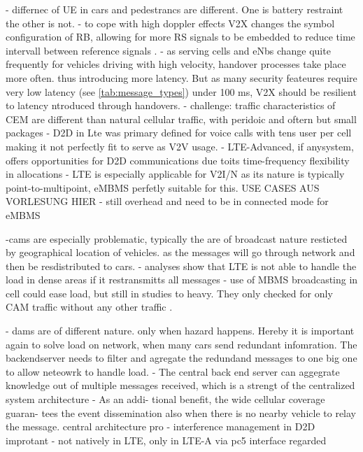 \documentclass[conference,12pt,onecolumn]{IEEEtran}
\begin{document}
- differnec of UE in cars and pedestrancs are different. One is battery restraint the other is not.
- to cope with high doppler effects V2X changes the symbol configuration of RB, allowing for more RS signals to be embedded to reduce time intervall between reference signals \cite{seo2016}.
- as serving cells and eNbs change quite frequently for vehicles driving with high velocity, handover processes take place more often. thus introducing more latency. But as many security feateures require very low latency (see \ref{tab:message_types}) under 100 ms, V2X should be resilient to latency ntroduced through handovers. \cite{seo2016}
- challenge: traffic characteristics of CEM are different than natural cellular traffic, with peridoic and oftern but small packages \cite{seo2016}
- D2D in Lte was primary defined for voice calls with tens user per cell \cite{seo2016} making it not perfectly fit to serve as V2V usage.
- LTE-Advanced, if anysystem,  offers  opportunities  for  D2D  communications  due  toits time-frequency flexibility in allocations \cite{doppler2009}
- LTE is especially applicable for V2I/N as its nature is typically point-to-multipoint, eMBMS perfetly suitable for this. USE CASES AUS VORLESUNG HIER \cite{seo2016}
- still overhead and need to be in connected mode for eMBMS

-cams are especially problematic, typically the are of broadcast nature resticted by geographical location of vehicles. as the messages will go through network and then be resdistributed to cars.
- analyses show that LTE is not able to handle the load in dense areas if it restransmitts all messages \cite{araniti2013}
- use of MBMS broadcasting in cell could ease load, but still in studies to heavy. They only checked for only CAM traffic without any other traffic \cite{araniti2013}.

- dams are of different nature. only when hazard happens. Hereby it is important again to solve load on network, when many cars send redundant infomration. The backendserver needs to filter and agregate the redundand messages to one big one to allow neteowrk to handle load. \cite{araniti2013}
- The central back end server can aggegrate knowledge out of multiple messages received, which is a strengt of the centralized system architecture \cite{araniti2013}
- As an addi- tional benefit, the wide cellular coverage guaran- tees the event dissemination also when there is no nearby vehicle to relay the message. central architecture pro
- interference management in D2D improtant
- not natively in LTE, only in LTE-A via pc5 interface regarded
\end{document}
